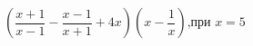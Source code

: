 \begin{ex}[type=simplify_calculate]
	\begin{condition}
		\( \left( \dfrac{x+1}{x-1}-\dfrac{x-1}{x+1}+4x \right)\left( x-\dfrac{1}{x} \right) \),\quad при \( x=5 \)
	\end{condition}
\end{ex}